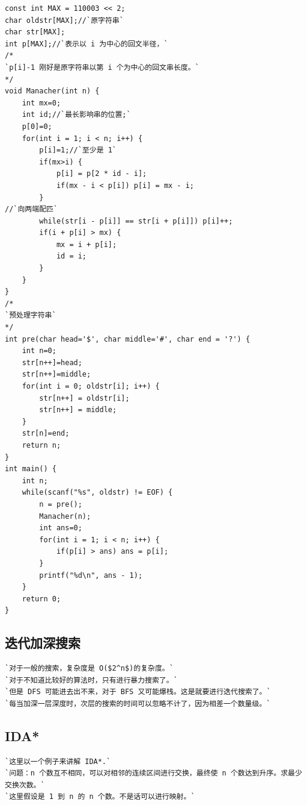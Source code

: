 \documentclass[a4paper]{article}
\begin{document}
\begin{CJK*}{UTF8}{gbsn}
\begin{multicols}{3}
\begin{flushleft}
\begin{lstlisting}
const int MAX = 110003 << 2;
char oldstr[MAX];//`原字符串`
char str[MAX];
int p[MAX];//`表示以 i 为中心的回文半径，`
/*
`p[i]-1 刚好是原字符串以第 i 个为中心的回文串长度。`
*/
void Manacher(int n) {
    int mx=0;
    int id;//`最长影响串的位置;`
    p[0]=0;
    for(int i = 1; i < n; i++) {
        p[i]=1;//`至少是 1`
        if(mx>i) {
            p[i] = p[2 * id - i];
            if(mx - i < p[i]) p[i] = mx - i;
        }
//`向两端配匹`
        while(str[i - p[i]] == str[i + p[i]]) p[i]++;
        if(i + p[i] > mx) {
            mx = i + p[i];
            id = i;
        }
    }
}
/*
`预处理字符串`
*/
int pre(char head='$', char middle='#', char end = '?') {
    int n=0;
    str[n++]=head;
    str[n++]=middle;
    for(int i = 0; oldstr[i]; i++) {
        str[n++] = oldstr[i];
        str[n++] = middle;
    }
    str[n]=end;
    return n;
}
int main() {
    int n;
    while(scanf("%s", oldstr) != EOF) {
        n = pre();
        Manacher(n);
        int ans=0;
        for(int i = 1; i < n; i++) {
            if(p[i] > ans) ans = p[i];
        }
        printf("%d\n", ans - 1);
    }
    return 0;
}

\end{lstlisting}


\subsection{迭代加深搜索}
\begin{lstlisting}
`对于一般的搜索，复杂度是 O($2^n$)的复杂度。`
`对于不知道比较好的算法时，只有进行暴力搜索了。`
`但是 DFS 可能进去出不来，对于 BFS 又可能爆栈。这是就要进行迭代搜索了。`
`每当加深一层深度时，次层的搜索的时间可以忽略不计了，因为相差一个数量级。`
\end{lstlisting}


\subsection{IDA*}
\begin{lstlisting}
`这里以一个例子来讲解 IDA*.`
`问题：n 个数互不相同，可以对相邻的连续区间进行交换，最终使 n 个数达到升序。求最少交换次数。`
`这里假设是 1 到 n 的 n 个数。不是话可以进行映射。`



\end{lstlisting}
\end{flushleft}
\end{multicols}
\end{CJK*}
\end{document}
